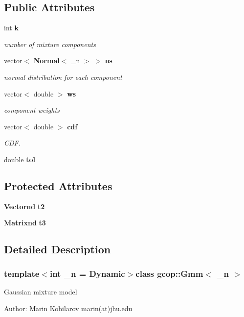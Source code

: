 \subsection*{\-Public \-Attributes}
\begin{DoxyCompactItemize}
\item 
int {\bf k}
\begin{DoxyCompactList}\small\item\em number of mixture components \end{DoxyCompactList}\item 
vector$<$ {\bf \-Normal}$<$ \-\_\-n $>$ $>$ {\bf ns}
\begin{DoxyCompactList}\small\item\em normal distribution for each component \end{DoxyCompactList}\item 
vector$<$ double $>$ {\bf ws}
\begin{DoxyCompactList}\small\item\em component weights \end{DoxyCompactList}\item 
vector$<$ double $>$ {\bf cdf}
\begin{DoxyCompactList}\small\item\em \-C\-D\-F. \end{DoxyCompactList}\item 
double {\bf tol}
\end{DoxyCompactItemize}
\subsection*{\-Protected \-Attributes}
\begin{DoxyCompactItemize}
\item 
{\bf \-Vectornd} {\bf t2}
\item 
{\bf \-Matrixnd} {\bf t3}
\end{DoxyCompactItemize}


\subsection{\-Detailed \-Description}
\subsubsection*{template$<$int \-\_\-n = \-Dynamic$>$class gcop\-::\-Gmm$<$ \-\_\-n $>$}

\-Gaussian mixture model

\-Author\-: \-Marin \-Kobilarov marin(at)jhu.\-edu 

